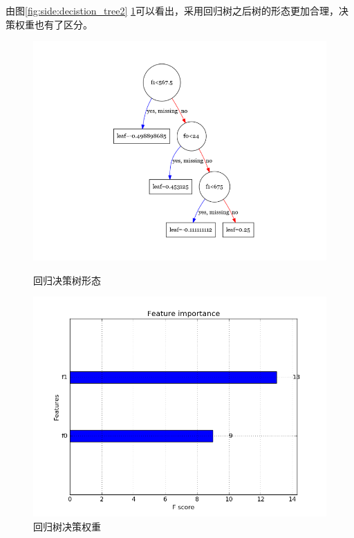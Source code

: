 \documentclass[a4paper, cs4size, oneside]{article}
\begin{document}
由图\ref{fig:side:decistion_tree2} \ref{fig:side:importance2}可以看出，采用回归树之后树的形态更加合理，决策权重也有了区分。

\begin{figure}
\begin{minipage}[htb]{0.5\linewidth}
\centering
\includegraphics[width=0.9\linewidth]{figures/decision_tree2.png}
\caption{回归决策树形态}
\label{fig:side:decistion_tree2}
\end{minipage}%
\begin{minipage}[htb]{0.5\linewidth}
\centering
\includegraphics[width=0.9\linewidth]{figures/importance2.png}
\caption{回归树决策权重}
\label{fig:side:importance2}
\end{minipage}
\end{figure}
\end{document}
